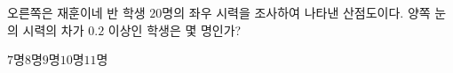 \noindent\begin{minipage}[t]{0.58\linewidth}\vspace{0pt}\raggedright 오른쪽은 재훈이네 반 학생 $20$명의 좌우 시력을 조사하여 나타낸 산점도이다. 양쪽 눈의 시력의 차가 $0.2$ 이상인 학생은 몇 명인가?\end{minipage}\hfill\begin{minipage}[t]{0.4\linewidth}\vspace{0pt}\centering \resizebox{\ifdim\width>\linewidth\linewidth\else\width\fi}{!}{}\end{minipage}\par
\begin{choicesii}{$7$명}{$8$명}{$9$명}{$10$명}{$11$명}\end{choicesii}
